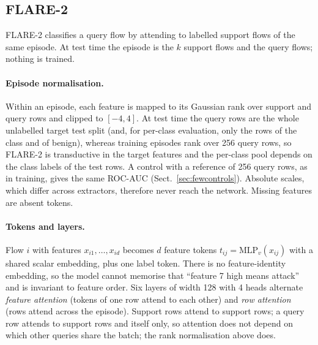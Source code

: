 \documentclass[11pt]{article}
\begin{document}
\subsection{FLARE-2}\label{sec:method}
FLARE-2 classifies a query flow by attending to labelled support flows of the same episode.
At test time the episode is the $k$ support flows and the query flows; nothing is trained.

\paragraph{Episode normalisation.}
Within an episode, each feature is mapped to its Gaussian rank over support and query rows and clipped to $[-4,4]$. At test time the query rows are the whole unlabelled target test split (and, for per-class evaluation, only the rows of the class and of benign), whereas training episodes rank over 256 query rows, so FLARE-2 is transductive in the target features and the per-class pool depends on the class labels of the test rows. A control with a reference of 256 query rows, as in training, gives the same ROC-AUC (Sect.~\ref{sec:fewcontrols}).
Absolute scales, which differ across extractors, therefore never reach the network.
Missing features are absent tokens.

\paragraph{Tokens and layers.}
Flow $i$ with features $x_{i1},\dots,x_{id}$ becomes $d$ feature tokens $t_{ij}=\mathrm{MLP}_v(x_{ij})$ with a shared scalar embedding, plus one label token.
There is no feature-identity embedding, so the model cannot memorise that ``feature 7 high means attack'' and is invariant to feature order.
Six layers of width 128 with 4 heads alternate \emph{feature attention} (tokens of one row attend to each other) and \emph{row attention} (rows attend across the episode).
Support rows attend to support rows; a query row attends to support rows and itself only, so attention does not depend on which other queries share the batch; the rank normalisation above does.
\end{document}

